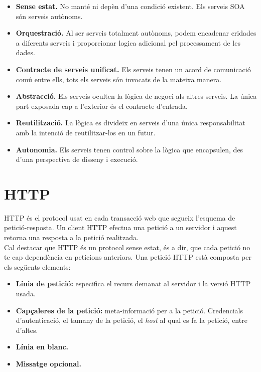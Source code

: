 \begin{itemize}
	\item \textbf{Sense estat.} No manté ni depèn d'una condició existent. Els serveis \ac{SOA} són serveis autònoms.

	\item \textbf{Orquestració.} Al ser serveis totalment autònoms, podem encadenar cridades a diferents serveis i proporcionar logica adicional pel processament de les dades.
	
	\item \textbf{Contracte de serveis unificat.} Els serveis tenen un acord de comunicació comú entre ells, tots els serveis són invocats de la mateixa manera.
	
	\item \textbf{Abstracció.} Els serveis oculten la lògica de negoci als altres serveis. La única part exposada cap a l'exterior és el contracte d'entrada.
	
	\item \textbf{Reutilització.} La lògica es divideix en serveis d'una única responsabilitat amb la intenció de reutilitzar-los en un futur.
	
	\item \textbf{Autonomia.} Els serveis tenen control sobre la lògica que encapsulen, des d'una perspectiva de disseny i execució.
\end{itemize}

\section{\ac{HTTP}}\label{sec_http}

\ac{HTTP} és el protocol usat en cada transacció web que segueix l'esquema de petició-resposta. Un client \ac{HTTP} efectua una petició a un servidor i aquest retorna una resposta a la petició realitzada.\\
\newline
Cal destacar que \ac{HTTP} és un protocol sense estat, és a dir, que cada petició no te cap dependència en peticions anteriors. Una petició \ac{HTTP} està composta per els següents elements:
\begin{itemize}
	\item \textbf{Línia de petició:} especifica el recurs demanat al servidor i la versió \ac{HTTP} usada.
	\item \textbf{Capçaleres de la petició:} meta-informació per a la petició. Credencials d'autenticació, el tamany de la petició, el \emph{host} al qual es fa la petició, entre d'altes.
	\item \textbf{Línia en blanc.}
	\item \textbf{Missatge opcional.}
\end{itemize}
 
